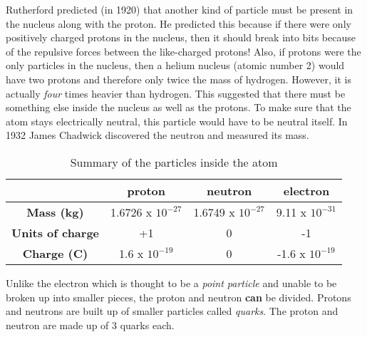 \begin{IFact}{
Rutherford predicted (in 1920) that another kind of particle must be
present in the nucleus along with the proton. He predicted this because
if there were only positively charged protons in the nucleus, then it should break
into bits because of the repulsive forces between the like-charged protons! Also, 
if protons were the only particles
in the nucleus, then a helium nucleus (atomic number 2) would have
two protons and therefore only twice the mass of hydrogen. However,
it is actually \emph{four} times heavier than hydrogen. This suggested that there
must be something else inside the nucleus as well as the protons.
To make sure that the atom stays electrically neutral, this particle would have to be neutral itself. In 1932 James Chadwick discovered the neutron and measured
its mass.
}
\end{IFact}



\begin{table}[!hp]
  \begin{center}
    \begin{tabular}{|c|c|c|c|}\hline \hline
      \textbf{}      & \textbf{proton}  & \textbf{neutron} & \textbf{electron} \\ \hline
      \textbf{Mass (kg)}  & 1.6726 x $10^{-27}$  & 1.6749 x $10^{-27}$  & 9.11 x $10^{-31}$ \\ \hline
      \textbf{Units of charge}&      +1     &     0       &   -1    \\ \hline 
      \textbf{Charge (C)} &  1.6 x $10^{-19}$  &     0      &  -1.6 x $10^{-19}$   \\ \hline  \hline
    \end{tabular}
  \end{center}
  \caption{Summary of the particles inside the atom}
  \label{table:atom::summary}
\end{table}

\begin{IFact}{Unlike the electron which is thought to be a \emph{point particle} and unable
to be broken up into smaller pieces, the proton and neutron \textbf{can} be divided. 
Protons and neutrons are built up of smaller particles called \emph{quarks}. The proton 
and neutron are made up of 3 quarks each.}
\end{IFact}






